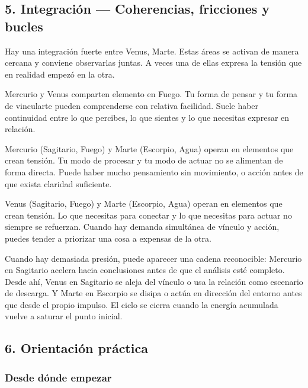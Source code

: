 \documentclass[11pt,a4paper]{article}
\begin{document}
\vspace{0.8cm}

\subsection{5. Integración — Coherencias, fricciones y bucles}

\justifying
Hay una integración fuerte entre Venus, Marte. Estas áreas se activan de manera cercana y conviene observarlas juntas. A veces una de ellas expresa la tensión que en realidad empezó en la otra.

Mercurio y Venus comparten elemento en Fuego. Tu forma de pensar y tu forma de vincularte pueden comprenderse con relativa facilidad. Suele haber continuidad entre lo que percibes, lo que sientes y lo que necesitas expresar en relación.

Mercurio (Sagitario, Fuego) y Marte (Escorpio, Agua) operan en elementos que crean tensión. Tu modo de procesar y tu modo de actuar no se alimentan de forma directa. Puede haber mucho pensamiento sin movimiento, o acción antes de que exista claridad suficiente.

Venus (Sagitario, Fuego) y Marte (Escorpio, Agua) operan en elementos que crean tensión. Lo que necesitas para conectar y lo que necesitas para actuar no siempre se refuerzan. Cuando hay demanda simultánea de vínculo y acción, puedes tender a priorizar una cosa a expensas de la otra.

Cuando hay demasiada presión, puede aparecer una cadena reconocible: Mercurio en Sagitario acelera hacia conclusiones antes de que el análisis esté completo. Desde ahí, Venus en Sagitario se aleja del vínculo o usa la relación como escenario de descarga. Y Marte en Escorpio se disipa o actúa en dirección del entorno antes que desde el propio impulso. El ciclo se cierra cuando la energía acumulada vuelve a saturar el punto inicial.

\vspace{0.8cm}

\subsection{6. Orientación práctica}

\subsubsection*{Desde dónde empezar}
\end{document}
